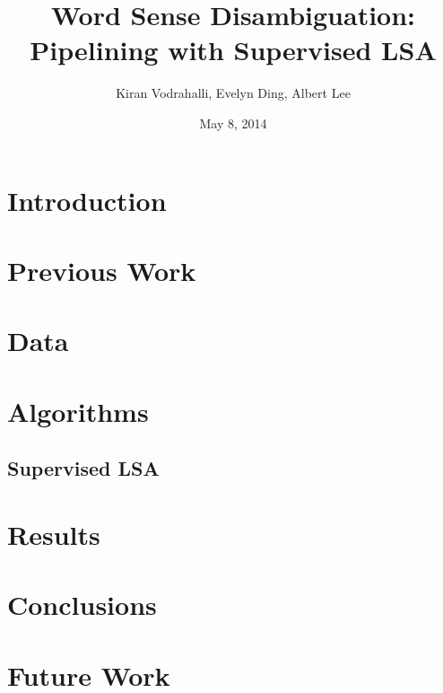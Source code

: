 \documentclass[10pt, letterpaper]{article}
\author{Kiran Vodrahalli, Evelyn Ding, Albert Lee}
\title{Word Sense Disambiguation: Pipelining with Supervised LSA}
\date{May 8, 2014}
\begin{document}
	\maketitle
	
	\section{Introduction}
	\section{Previous Work}
	\section{Data}
	\section{Algorithms}
	\subsection{Supervised LSA}
	\section{Results}
	\section{Conclusions}
	\section{Future Work}
\end{document}
